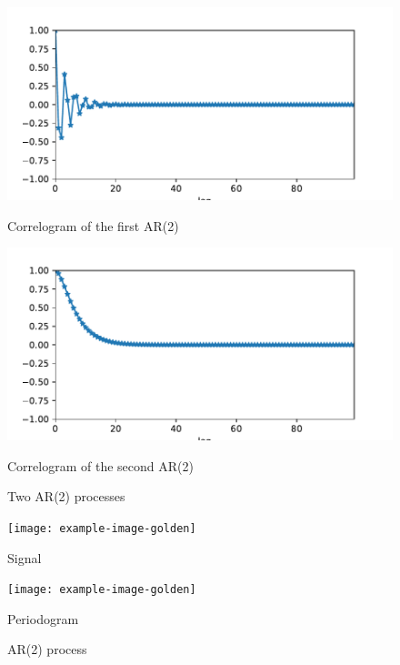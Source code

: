 \documentclass[11pt]{article}
\begin{document}
\begin{exercise}[subtitle=AR(2) process]
\begin{figure}
    \centering
    \begin{minipage}[t]{0.45\textwidth}
    \centerline{\includegraphics[width=\textwidth]{images/acf1.pdf}}
    \centerline{Correlogram of the first AR(2)}
    \end{minipage}
    \hfill
    \begin{minipage}[t]{0.45\textwidth}    \centerline{\includegraphics[width=\textwidth]{images/acf2.pdf}}
    \centerline{Correlogram of the second AR(2)}
    \end{minipage}
    \caption{Two AR(2) processes}\label{fig:q-ar-2-corr}
\end{figure}



\end{exercise}

\begin{solution}  %

\begin{figure}
    \centering
    \begin{minipage}[t]{0.45\textwidth}
    \centerline{\texttt{[image: example-image-golden]}}
    \centerline{Signal}
    \end{minipage}
    \hfill
    \begin{minipage}[t]{0.45\textwidth}    \centerline{\texttt{[image: example-image-golden]}}
    \centerline{Periodogram}
    \end{minipage}
    \caption{AR(2) process}\label{fig:q-ar-2}
\end{figure}

\end{solution}
\end{document}
